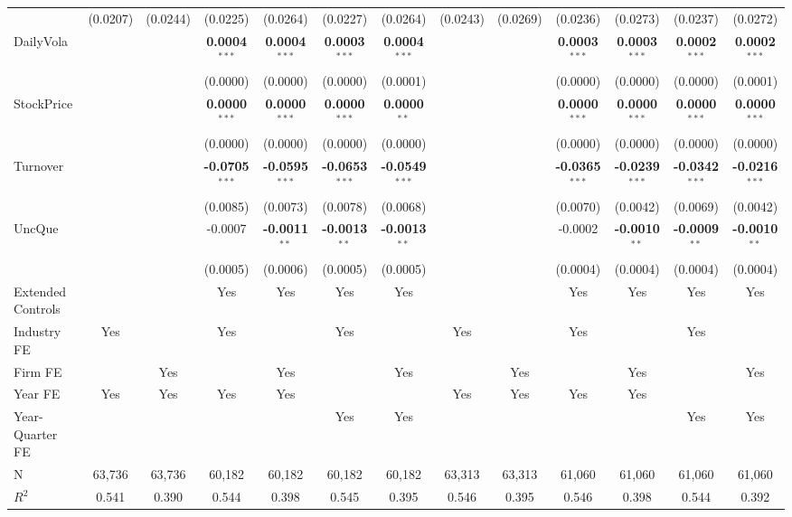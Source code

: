 \documentclass[11pt,a4paper]{article}
\begin{document}
\begin{table}[htbp]
\begin{tabular}{lcccccccccccc}
 & (0.0207) & (0.0244) & (0.0225) & (0.0264) & (0.0227) & (0.0264) & (0.0243) & (0.0269) & (0.0236) & (0.0273) & (0.0237) & (0.0272) \\
DailyVola &  &  & \textbf{0.0004}$^{***}$ & \textbf{0.0004}$^{***}$ & \textbf{0.0003}$^{***}$ & \textbf{0.0004}$^{***}$ &  &  & \textbf{0.0003}$^{***}$ & \textbf{0.0003}$^{***}$ & \textbf{0.0002}$^{***}$ & \textbf{0.0002}$^{***}$ \\
 &  &  & (0.0000) & (0.0000) & (0.0000) & (0.0001) &  &  & (0.0000) & (0.0000) & (0.0000) & (0.0001) \\
StockPrice &  &  & \textbf{0.0000}$^{***}$ & \textbf{0.0000}$^{***}$ & \textbf{0.0000}$^{***}$ & \textbf{0.0000}$^{**}$ &  &  & \textbf{0.0000}$^{***}$ & \textbf{0.0000}$^{***}$ & \textbf{0.0000}$^{***}$ & \textbf{0.0000}$^{***}$ \\
 &  &  & (0.0000) & (0.0000) & (0.0000) & (0.0000) &  &  & (0.0000) & (0.0000) & (0.0000) & (0.0000) \\
Turnover &  &  & \textbf{-0.0705}$^{***}$ & \textbf{-0.0595}$^{***}$ & \textbf{-0.0653}$^{***}$ & \textbf{-0.0549}$^{***}$ &  &  & \textbf{-0.0365}$^{***}$ & \textbf{-0.0239}$^{***}$ & \textbf{-0.0342}$^{***}$ & \textbf{-0.0216}$^{***}$ \\
 &  &  & (0.0085) & (0.0073) & (0.0078) & (0.0068) &  &  & (0.0070) & (0.0042) & (0.0069) & (0.0042) \\
UncQue &  &  & -0.0007 & \textbf{-0.0011}$^{**}$ & \textbf{-0.0013}$^{**}$ & \textbf{-0.0013}$^{**}$ &  &  & -0.0002 & \textbf{-0.0010}$^{**}$ & \textbf{-0.0009}$^{**}$ & \textbf{-0.0010}$^{**}$ \\
 &  &  & (0.0005) & (0.0006) & (0.0005) & (0.0005) &  &  & (0.0004) & (0.0004) & (0.0004) & (0.0004) \\
\midrule
Extended Controls &  &  & Yes & Yes & Yes & Yes &  &  & Yes & Yes & Yes & Yes \\
Industry FE & Yes &  & Yes &  & Yes &  & Yes &  & Yes &  & Yes &  \\
Firm FE &  & Yes &  & Yes &  & Yes &  & Yes &  & Yes &  & Yes \\
Year FE & Yes & Yes & Yes & Yes &  &  & Yes & Yes & Yes & Yes &  &  \\
Year-Quarter FE &  &  &  &  & Yes & Yes &  &  &  &  & Yes & Yes \\
\midrule
N & 63,736 & 63,736 & 60,182 & 60,182 & 60,182 & 60,182 & 63,313 & 63,313 & 61,060 & 61,060 & 61,060 & 61,060 \\
$R^2$ & 0.541 & 0.390 & 0.544 & 0.398 & 0.545 & 0.395 & 0.546 & 0.395 & 0.546 & 0.398 & 0.544 & 0.392 \\

\end{tabular}
\end{table}
\end{document}

